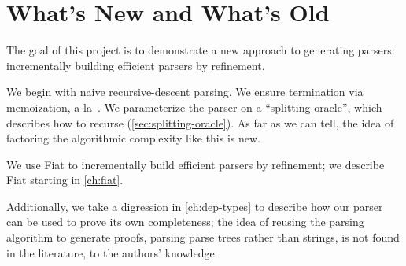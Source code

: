 \section{What's New and What's Old} \label{sec:new} \label{sec:goals}
  The goal of this project is to demonstrate a new approach to generating parsers: incrementally building efficient parsers by refinement.
  
  We begin with naive recursive-descent parsing.    We ensure termination via memoization, a la~\cite{Ridge}.  We parameterize the parser on a ``splitting oracle'', which describes how to recurse (\autoref{sec:splitting-oracle}).  As far as we can tell, the idea of factoring the algorithmic complexity like this is new.
  
  We use Fiat to incrementally build efficient parsers by refinement; we describe Fiat starting in \autoref{ch:fiat}. 
  
  Additionally, we take a digression in \autoref{ch:dep-types} to describe how our parser can be used to prove its own completeness; the idea of reusing the parsing algorithm to generate proofs, parsing parse trees rather than strings, is not found in the literature, to the authors' knowledge.
